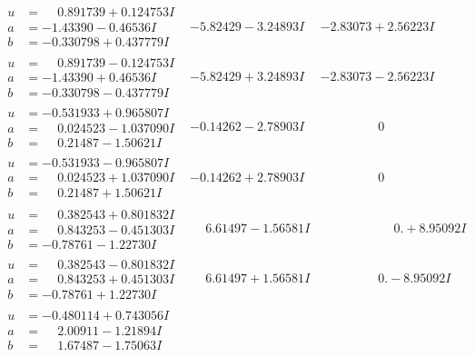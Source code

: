 \documentclass[1p]{elsarticle_modified}
\theoremstyle{definition}
\begin{document}
$$\begin{array}{c|c|c}
\begin{aligned}
u &= \phantom{-}0.891739 + 0.124753 I \\
a &= -1.43390 - 0.46536 I \\
b &= -0.330798 + 0.437779 I\end{aligned}
 & -5.82429 - 3.24893 I & -2.83073 + 2.56223 I \\ \hline\begin{aligned}
u &= \phantom{-}0.891739 - 0.124753 I \\
a &= -1.43390 + 0.46536 I \\
b &= -0.330798 - 0.437779 I\end{aligned}
 & -5.82429 + 3.24893 I & -2.83073 - 2.56223 I \\ \hline\begin{aligned}
u &= -0.531933 + 0.965807 I \\
a &= \phantom{-}0.024523 - 1.037090 I \\
b &= \phantom{-}0.21487 - 1.50621 I\end{aligned}
 & -0.14262 - 2.78903 I & \phantom{-0.000000 } 0 \\ \hline\begin{aligned}
u &= -0.531933 - 0.965807 I \\
a &= \phantom{-}0.024523 + 1.037090 I \\
b &= \phantom{-}0.21487 + 1.50621 I\end{aligned}
 & -0.14262 + 2.78903 I & \phantom{-0.000000 } 0 \\ \hline\begin{aligned}
u &= \phantom{-}0.382543 + 0.801832 I \\
a &= \phantom{-}0.843253 - 0.451303 I \\
b &= -0.78761 - 1.22730 I\end{aligned}
 & \phantom{-}6.61497 - 1.56581 I & \phantom{-0.000000 -}0. + 8.95092 I \\ \hline\begin{aligned}
u &= \phantom{-}0.382543 - 0.801832 I \\
a &= \phantom{-}0.843253 + 0.451303 I \\
b &= -0.78761 + 1.22730 I\end{aligned}
 & \phantom{-}6.61497 + 1.56581 I & \phantom{-0.000000 } 0. - 8.95092 I \\ \hline\begin{aligned}
u &= -0.480114 + 0.743056 I \\
a &= \phantom{-}2.00911 - 1.21894 I \\
b &= \phantom{-}1.67487 - 1.75063 I\end{aligned}

\end{array}$$
\end{document}
